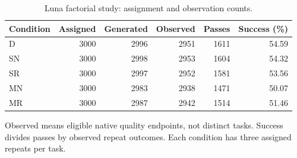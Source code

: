 \begin{table}[htbp]\centering\small
\caption{Luna factorial study: assignment and observation counts.}
\label{tab:scale-quality}
\begin{tabular}{lrrrrr}\toprule
Condition & Assigned & Generated & Observed & Passes & Success (\%)\\\midrule
D & 3000 & 2996 & 2951 & 1611 & 54.59\\
SN & 3000 & 2998 & 2953 & 1604 & 54.32\\
SR & 3000 & 2997 & 2952 & 1581 & 53.56\\
MN & 3000 & 2983 & 2938 & 1471 & 50.07\\
MR & 3000 & 2987 & 2942 & 1514 & 51.46\\
\bottomrule\end{tabular}
\par\smallskip\noindent Observed means eligible native quality endpoints, not distinct tasks. Success divides passes by observed repeat outcomes. Each condition has three assigned repeats per task.
\end{table}
